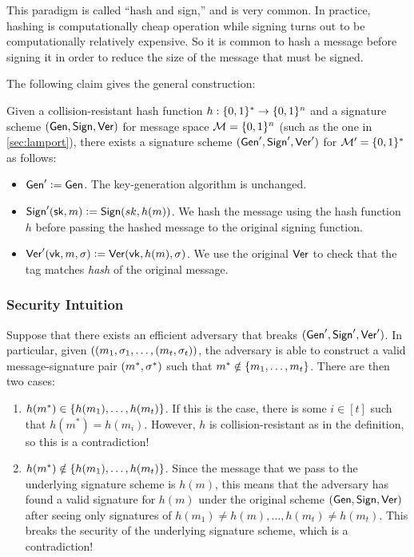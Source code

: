 This paradigm is called ``hash and sign,'' and is very common.
In practice, hashing is computationally cheap operation while signing turns out to be computationally relatively expensive.
So it is common to hash a message before signing it in order to reduce the size of the message that must be signed. 

The following claim gives the general construction: 

\begin{claim}
Given a collision-resistant hash function $h: \{0,1\}^* \rightarrow \{0,1\}^{n}$ and a signature scheme $(\mathsf{Gen}, \mathsf{Sign}, \mathsf{Ver})$ for message space $\mathcal{M} = \{0,1\}^n$ (such as the one in \cref{sec:lamport}), there exists a signature scheme $(\mathsf{Gen}', \mathsf{Sign}', \mathsf{Ver}')$ for $\mathcal{M}' = \{0,1\}^*$ as follows:

\begin{itemize}
  \item $\mathsf{Gen}' \mathrel{\mathop:}= \mathsf{Gen}$. The key-generation algorithm is unchanged.
	\item $\mathsf{Sign}'({\mathsf{sk}}, m) \mathrel{\mathop:}= \mathsf{Sign}(sk, h(m))$. We hash the message using the hash function $h$ before passing the hashed message to the original signing function.
	\item $\mathsf{Ver}'(\mathsf{vk}, m, \sigma) \mathrel{\mathop:}= \mathsf{Ver}(\mathsf{vk}, h(m), \sigma)$. We use the original $\mathsf{Ver}$ to check that the tag matches \emph{hash} of the original message.
\end{itemize}
\end{claim}

\subsubsection{Security Intuition}
Suppose that there exists an efficient adversary that breaks $(\mathsf{Gen}', \mathsf{Sign}', \mathsf{Ver}')$.
In particular, given $((m_1, \sigma_1, \ldots, (m_t, \sigma_t))$, the adversary is able to construct a valid
message-signature pair $(m^*, \sigma^*)$ such that $m^* \notin \left\{ m_1, \ldots, m_t \right\}$.
There are then two cases: 

\begin{enumerate}
	\item $h(m^*) \in \left\{ h(m_1), \ldots, h(m_t) \right\}$. If this is the case, there is some $i \in [t]$ such that $h(m^*) = h(m_i)$. However, $h$ is collision-resistant as in the definition, so this is a contradiction!
	\item $h(m^*) \notin \left\{ h(m_1), \ldots, h(m_t) \right\}$. Since the message that we pass to the underlying signature scheme is $h(m)$, this means that the adversary has found a valid signature for $h(m)$ under the original scheme $(\mathsf{Gen}, \mathsf{Sign}, \mathsf{Ver})$ after seeing only signatures of $h(m_1)\neq h(m), \ldots, h(m_t)\neq h(m_t)$. This breaks the security of the underlying signature scheme, which is a contradiction!
\end{enumerate}

